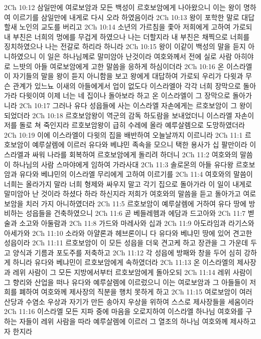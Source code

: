 2Ch 10:12  삼일만에 여로보암과 모든 백성이 르호보암에게 나아왔으니 이는 왕이 명하여 이르기를 삼일만에 내게로 다시 오라 하였음이라
2Ch 10:13  왕이 포학한 말로 대답할새 노인의 교도를 버리고
2Ch 10:14  소년의 가르침을 좇아 저희에게 고하여 가로되 내 부친은 너희의 멍에를 무겁게 하였으나 나는 더할지라 내 부친은 채찍으로 너희를 징치하였으나 나는 전갈로 하리라 하니라
2Ch 10:15  왕이 이같이 백성의 말을 듣지 아니하였으니 이 일은 하나님께로 말미암아 난것이라 여호와께서 전에 실로 사람 아히야로 느밧의 아들 여로보암에게 고한 말씀을 응하게 하심이더라
2Ch 10:16  온 이스라엘이 자기들의 말을 왕이 듣지 아니함을 보고 왕에게 대답하여 가로되 우리가 다윗과 무슨 관계가 있느뇨 이새의 아들에게서 업이 없도다 이스라엘아 각각 너희 장막으로 돌아가라 다윗이여 이제 너는 네 집이나 돌아보라 하고 온 이스라엘이 그 장막으로 돌아가니라
2Ch 10:17  그러나 유다 성읍들에 사는 이스라엘 자손에게는 르호보암이 그 왕이 되었더라
2Ch 10:18  르호보암왕이 역군의 감독 하도람을 보내었더니 이스라엘 자손이 저를 돌로 쳐 죽인지라 르호보암왕이 급히 수레에 올라 예루살렘으로 도망하였더라
2Ch 10:19  이에 이스라엘이 다윗의 집을 배반하여 오늘날까지 이르니라
2Ch 11:1  르호보암이 예루살렘에 이르러 유다와 베냐민 족속을 모으니 택한 용사가 십 팔만이라 이스라엘과 싸워 나라를 회복하여 르호보암에게 돌리려 하더니
2Ch 11:2  여호와의 말씀이 하나님의 사람 스마야에게 임하여 가라사대
2Ch 11:3  솔로몬의 아들 유다왕 르호보암과 유다와 베냐민의 이스라엘 무리에게 고하여 이르기를
2Ch 11:4  여호와의 말씀이 너희는 올라가지 말라 너희 형제와 싸우지 말고 각기 집으로 돌아가라 이 일이 내게로 말미암아 난 것이라 하셨다 하라 하신지라 저희가 여호와의 말씀을 듣고 돌아가고 여로보암을 치러 가지 아니하였더라
2Ch 11:5  르호보암이 예루살렘에 거하여 유다 땅에 방비하는 성읍들을 건축하였으니
2Ch 11:6  곧 베들레헴과 에담과 드고아와
2Ch 11:7  벧술과 소고와 아둘람과
2Ch 11:8  가드와 마레사와 십과
2Ch 11:9  아도라임과 라기스와 아세가와
2Ch 11:10  소라와 아얄론과 헤브론이니 다 유다와 베냐민 땅에 있어 견고한 성읍이라
2Ch 11:11  르호보암이 이 모든 성읍을 더욱 견고케 하고 장관을 그 가운데 두고 양식과 기름과 포도주를 저축하고
2Ch 11:12  각 성읍에 방패와 창을 두어 심히 강하게 하니라 유다와 베냐민이 르호보암에게 속하였더라
2Ch 11:13  온 이스라엘의 제사장과 레위 사람이 그 모든 지방에서부터 르호보암에게 돌아오되
2Ch 11:14  레위 사람이 그 향리와 산업을 떠나 유다와 예루살렘에 이르렀으니 이는 여로보암과 그 아들들이 저희를 폐하여 여호와께 제사장의 직분을 행치 못하게 하고
2Ch 11:15  여로보암이 여러 산당과 수염소 우상과 자기가 만든 송아지 우상을 위하여 스스로 제사장들을 세움이라
2Ch 11:16  이스라엘 모든 지파 중에 마음을 오로지하여 이스라엘 하나님 여호와를 구하는 자들이 레위 사람을 따라 예루살렘에 이르러 그 열조의 하나님 여호와께 제사하고자 한지라
